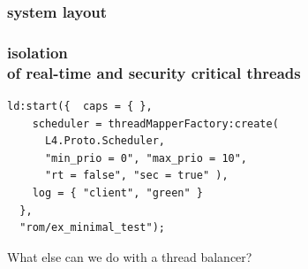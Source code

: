 \documentclass[utf8,10pt]{beamer}
\begin{document}
\begin{frame}
  \frametitle{system layout}
  \centering
  
\end{frame}


\begin{frame}[fragile]
  \frametitle{isolation \\of real-time and security critical threads}
  \centering
  \begin{minipage}[c]{\columnwidth}
    \begin{verbatim}
ld:start({  caps = { },
    scheduler = threadMapperFactory:create(
      L4.Proto.Scheduler,
      "min_prio = 0", "max_prio = 10",
      "rt = false", "sec = true" ),
    log = { "client", "green" }
  },
  "rom/ex_minimal_test");
    \end{verbatim}
  \end{minipage}
\end{frame}


\begin{frame}
  \centering
  What else can we do with a thread balancer?
\end{frame}
\end{document}

